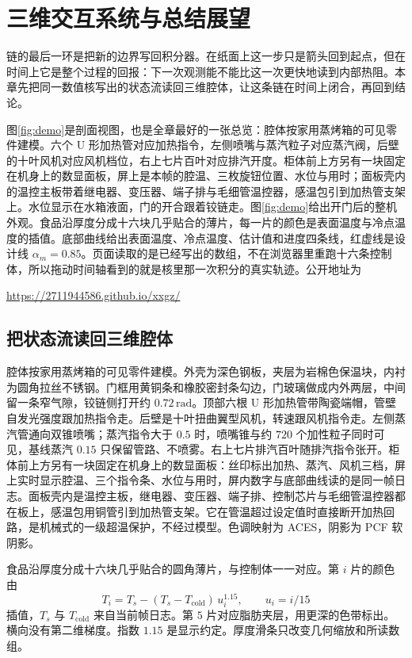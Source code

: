 \chapter{三维交互系统与总结展望}
\label{ch:close}
\label{ch:demo}

链的最后一环是把新的边界写回积分器。在纸面上这一步只是箭头回到起点，但在时间上它是整个过程的回报：下一次观测能不能比这一次更快地读到内部热阻。本章先把同一数值核写出的状态流读回三维腔体，让这条链在时间上闭合，再回到结论。

图\ref{fig:demo}{}是剖面视图，也是全章最好的一张总览：腔体按家用蒸烤箱的可见零件建模。六个 U 形加热管对应加热指令，左侧喷嘴与蒸汽粒子对应蒸汽阀，后壁的十叶风机对应风机档位，右上七片百叶对应排汽开度。柜体前上方另有一块固定在机身上的数显面板，屏上是本帧的腔温、三枚旋钮位置、水位与用时；面板壳内的温控主板带着继电器、变压器、端子排与毛细管温控器，感温包引到加热管支架上。水位显示在水箱液面，门的开合跟着铰链走。图\ref{fig:demo}{}给出开门后的整机外观。食品沿厚度分成十六块几乎贴合的薄片，每一片的颜色是表面温度与冷点温度的插值。底部曲线给出表面温度、冷点温度、估计值和进度四条线，红虚线是设计线 \(\alpha_m=0.85\)。页面读取的是已经写出的数组，不在浏览器里重跑十六条控制体，所以拖动时间轴看到的就是核里那一次积分的真实轨迹。公开地址为
\begin{center}
\url{https://2711944586.github.io/xxgz/}
\end{center}

\section{把状态流读回三维腔体}

腔体按家用蒸烤箱的可见零件建模。外壳为深色钢板，夹层为岩棉色保温块，内衬为圆角拉丝不锈钢。门框用黄铜条和橡胶密封条勾边，门玻璃做成内外两层，中间留一条窄气隙，铰链侧打开约 \(0.72\,\mathrm{rad}\)。顶部六根 U 形加热管带陶瓷端帽，管壁自发光强度跟加热指令走。后壁是十叶扭曲翼型风机，转速跟风机指令走。左侧蒸汽管通向双锥喷嘴；蒸汽指令大于 \(0.5\) 时，喷嘴锥与约 \(720\) 个加性粒子同时可见，基线蒸汽 \(0.15\) 只保留管路、不喷雾。右上七片排汽百叶随排汽指令张开。柜体前上方另有一块固定在机身上的数显面板：丝印标出加热、蒸汽、风机三档，屏上实时显示腔温、三个指令条、水位与用时，屏内数字与底部曲线读的是同一帧日志。面板壳内是温控主板，继电器、变压器、端子排、控制芯片与毛细管温控器都在板上，感温包用铜管引到加热管支架。它在管温超过设定值时直接断开加热回路，是机械式的一级超温保护，不经过模型。色调映射为 ACES，阴影为 PCF 软阴影。

食品沿厚度分成十六块几乎贴合的圆角薄片，与控制体一一对应。第 \(i\) 片的颜色由
\[
T_i=T_s-(T_s-T_{\mathrm{cold}})\,u_i^{1.15},\qquad u_i=i/15
\]
插值，\(T_s\) 与 \(T_{\mathrm{cold}}\) 来自当前帧日志。第 \(5\) 片对应脂肪夹层，用更深的色带标出。横向没有第二维梯度。指数 \(1.15\) 是显示约定。厚度滑条只改变几何缩放和所读数组。

